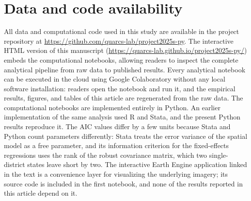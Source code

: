 \documentclass[
  letterpaper,
  DIV=11,
  numbers=noendperiod]{scrartcl}
\begin{document}
\section*{Data and code availability}\label{data-and-code-availability}

All data and computational code used in this study are available in the
project repository at
\url{https://github.com/quarcs-lab/project2025s-py}. The interactive
HTML version of this manuscript
(\url{https://quarcs-lab.github.io/project2025s-py/}) embeds the
computational notebooks, allowing readers to inspect the complete
analytical pipeline from raw data to published results. Every analytical
notebook can be executed in the cloud using Google Colaboratory without
any local software installation: readers open the notebook and run it,
and the empirical results, figures, and tables of this article are
regenerated from the raw data. The computational notebooks are
implemented entirely in Python. An earlier implementation of the same
analysis used R and Stata, and the present Python results reproduce it.
The AIC values differ by a few units because Stata and Python count
parameters differently: Stata treats the error variance of the spatial
model as a free parameter, and its information criterion for the
fixed-effects regressions uses the rank of the robust covariance matrix,
which two single-district states leave short by two. The interactive
Earth Engine application linked in the text is a convenience layer for
visualizing the underlying imagery; its source code is included in the
first notebook, and none of the results reported in this article depend
on it.
\end{document}
